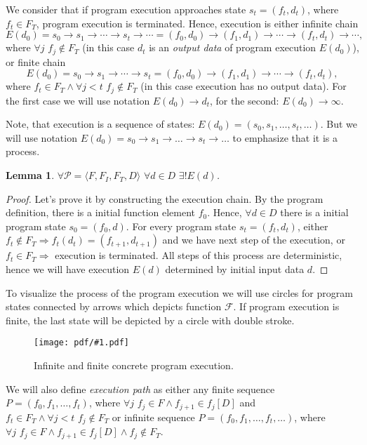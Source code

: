 \documentclass[oneside,a4]{article}  %
\newcommand{\Ra}{\Rightarrow}
\newcommand{\ra}{\rightarrow}
\newcommand{\term}[1]{\textit{#1}\index{#1}}
\newcommand{\centerimage}[2]{
\begin{figure}[h!]
    \begin{center}
        \texttt{[image: pdf/\#1.pdf]}
        \caption{#2}
    \end{center}
    \label{img:#1}
\end{figure}
}
\newtheorem{lemma}[theorem]{Lemma}
\begin{document}
We consider that if program execution approaches state $s_t = (f_t, d_t)$,
where $f_t \in F_T$, program execution is terminated.
Hence, execution is either infinite chain
\[E(d_0) = s_0 \ra s_1 \ra \cdots \ra s_t \ra \cdots =
        (f_0, d_0) \ra (f_1, d_1) \ra \cdots \ra (f_t, d_t) \ra \cdots,\]
where $\forall j \,\, f_j \notin F_T$ (in this case $d_t$ is an
\term{output data} of program execution $E(d_0)$),
or finite chain
\[E(d_0) = s_0 \ra s_1 \ra \cdots \ra s_t =
        (f_0, d_0) \ra (f_1, d_1) \ra \cdots \ra (f_t, d_t),\]
where $f_t \in F_T \land \forall j < t \,\, f_j \notin F_T$
(in this case execution has no output data).
For the first case we will use notation $E(d_0) \ra d_t$,
for the second: $E(d_0) \ra \infty$.

Note, that execution is a sequence of states:
$E(d_0) = (s_0, s_1, \dots, s_t, \dots)$.
But we will use notation
$E(d_0) = s_0 \ra s_1 \ra \dots \ra s_t \ra \dots$
to emphasize that it is a process.

\begin{lemma}
    \label{exists_one_execution}
    $\forall \mathcal{P} = \langle F, F_I, F_T, D \rangle \,\,
    \forall d \in D \,\, \exists! E(d)$.
\end{lemma}

\begin{proof}
    Let's prove it by constructing the execution chain.
    By the program definition, there is a initial function element $f_0$.
    Hence, $\forall d \in D$
    there is a initial program state $s_0 = (f_0, d)$.
    For every program state $s_t = (f_t, d_t)$,
    either $f_t \notin F_T \Ra f_t(d_t) = (f_{t + 1}, d_{t + 1})$
        and we have next step of the execution,
    or $f_t \in F_T \Ra$ execution is terminated.
    All steps of this process are deterministic,
    hence we will have execution $E(d)$ determined by initial input data $d$.
\end{proof}

To visualize the process of the program execution we will use circles
for program states connected by arrows which depicts function $\mathcal{F}$.
If program execution is finite, the last state will be depicted by
a circle with double stroke.

\centerimage{concrete_execution}
    {Infinite and finite concrete program execution.}

We will also define \term{execution path} as either any finite sequence
$P = (f_0, f_1, \dots, f_t)$, where
$\forall j \,\, f_j \in F \land f_{j + 1} \in f_j[D]$
and $f_t \in F_T \land \forall j < t \,\, f_j \notin F_T$
or infinite sequence $P = (f_0, f_1, \dots, f_t, \dots)$, where
$\forall j \,\, f_j \in F \land f_{j + 1} \in f_j[D] \land f_j \notin F_T$.
\end{document}

